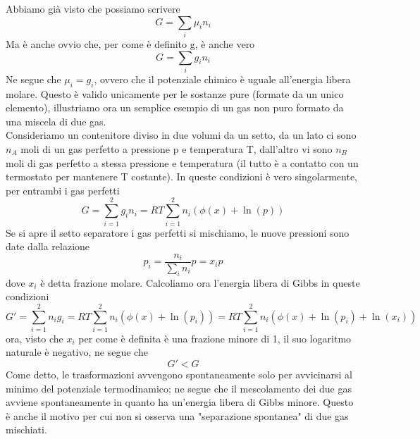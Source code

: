 \documentclass[
10pt, %
a4paper, %
oneside, %
headinclude,footinclude, %
BCOR5mm, %
]{scrartcl}
\begin{document}
Abbiamo già visto che possiamo scrivere
\[G = \sum_i \mu_i n_i\]
Ma è anche ovvio che, per come è definito g, è anche vero
\[G = \sum_i g_i n_i\]
Ne segue che \(\mu_i = g_i\), ovvero che il potenziale chimico è uguale all'energia libera molare. Questo è valido unicamente per le sostanze pure (formate da un unico elemento), illustriamo ora un semplice esempio di un gas non puro formato da una miscela di due gas.\\
Consideriamo un contenitore diviso in due volumi da un setto, da un lato ci sono \(n_A\) moli di un gas perfetto a pressione p e temperatura T, dall'altro vi sono \(n_B\) moli di gas perfetto a stessa pressione e temperatura (il tutto è a contatto con un termostato per mantenere T costante). In queste condizioni è vero singolarmente, per entrambi i gas perfetti
\[G=\sum_{i=1}^2 g_i n_i=RT\sum_{i=1}^2n_i(\phi(x)+\ln(p))\]
Se si apre il setto separatore i gas perfetti si mischiamo, le nuove pressioni sono date dalla relazione 
\[p_i = \frac{n_i}{\sum_i n_i}p=x_i p\]
dove \(x_i\) è detta frazione molare. Calcoliamo ora l'energia libera di Gibbs in queste condizioni
\[G'=\sum_{i=1}^2 n_ig_i = RT\sum_{i=1}^2 n_i(\phi(x)+\ln(p_i))=RT\sum_{i=1}^2 n_i(\phi(x)+\ln(p_i)+\ln(x_i))\]
ora, visto che \(x_i\) per come è definita è una frazione minore di 1, il suo logaritmo naturale è negativo, ne segue che
\[G'<G\]
Come detto, le trasformazioni avvengono spontaneamente solo per avvicinarsi al minimo del potenziale termodinamico; ne segue che il mescolamento dei due gas avviene spontaneamente in quanto ha un'energia libera di Gibbs minore. Questo è anche il motivo per cui non si osserva una "separazione spontanea" di due gas mischiati. 
\end{document}
